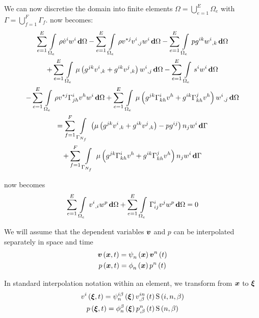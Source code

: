 We can now discretise the domain into finite elements \ie
$\Omega=\displaystyle{\bigcup_{e=1}^{E}}\Omega_{e}$ with
$\Gamma=\displaystyle{\bigcup_{f=1}^{F}}\Gamma_{f}$.  now
becomes:
\begin{multline}
  \gsum{e=1}{E}{\gint{\Omega_{e}}{}{\rho\dot{v}^{i}w^{i}}{\Omega}}
 -\gsum{e=1}{E}{\gint{\Omega_{e}}{}{\rho v^{*j}\partialderiv{v^{i}}{j}{w^{i}}}{\Omega}}
 -\gsum{e=1}{E}{\gint{\Omega_{e}}{}{pg^{ik}\partialderiv{w^{i}}{k}}{\Omega}}\\
 +\gsum{e=1}{E}{\gint{\Omega_{e}}{}{\mu\pbrac{g^{jk}\partialderiv{v^{i}}{k}+
       g^{ik}\partialderiv{v^{j}}{k}}\partialderiv{w^{i}}{j}}{\Omega}}
 -\gsum{e=1}{E}{\gint{\Omega_{e}}{}{s^{i}w^{i}}{\Omega}}\\
 -\gsum{e=1}{E}{\gint{\Omega_{e}}{}{\rho
     v^{*j}\christoffel{i}{j}{h}v^{h}w^{i}}{\Omega}}
 +\gsum{e=1}{E}{\gint{\Omega_{e}}{}{\mu\pbrac{g^{jk}\christoffel{i}{k}{h}v^{h}+
     g^{ik}\christoffel{j}{k}{h}v^{h}}\partialderiv{w^{i}}{j}}{\Omega}}\\
 =\gsum{f=1}{F}{\gint{\Gamma_{N_{f}}}{}{\pbrac{\mu\pbrac{g^{jk}\partialderiv{v^{i}}{k}+
         g^{ik}\partialderiv{v^{j}}{k}}-pg^{ij}}n_{j}w^{i}}{\Gamma}}\\
 +\gsum{f=1}{F}{\gint{\Gamma_{N_{f}}}{}{\mu\pbrac{g^{jk}\christoffel{i}{k}{h}v^{h}+
       g^{ik}\christoffel{j}{k}{h}v^{h}}n_{j}w^{i}}{\Gamma}}
 \label{eqn:FEMStokesEquationMomentum}
\end{multline}

 now becomes
\begin{equation}
  \gsum{e=1}{E}{\gint{\Omega_{e}}{}{\partialderiv{v^{i}}{i}w^{p}}{\Omega}}
  +\gsum{e=1}{E}{\gint{\Omega_{e}}{}{\christoffel{i}{i}{j}v^{j}w^{p}}{\Omega}}=0
  \label{eqn:FEMStokesEquationMass}
\end{equation}

We will assume that the dependent variables $\vectr{v}$ and $p$ can be
interpolated separately in space and time \ie
\begin{gather}
  \fnof{\vectr{v}}{\vectr{x},t}=\gbfn{n}{}{\vectr{x}}\fnof{\nodept{\vectr{v}}{n}}{t}\\
  \fnof{p}{\vectr{x},t}=\altgbfn{n}{}{\vectr{x}}\fnof{\nodept{p}{n}}{t}
\end{gather}

In standard interpolation notation within an element, we transform from
$\vectr{x}$ to $\vectr{\xi}$ \ie
\begin{gather}
  \fnof{v^{i}}{\vectr{\xi},t}=\idxgbfn{i}{n}{\beta}{\vectr{\xi}}
  \fnof{\idxnodedof{v}{i}{n}{\beta}}{t}\idxgsf{i}{n}{\beta}\\
  \fnof{p}{\vectr{\xi},t}=\altgbfn{n}{\beta}{\vectr{\xi}}
  \fnof{\nodedof{p}{n}{\beta}}{t}\gsf{n}{\beta}
\end{gather}


